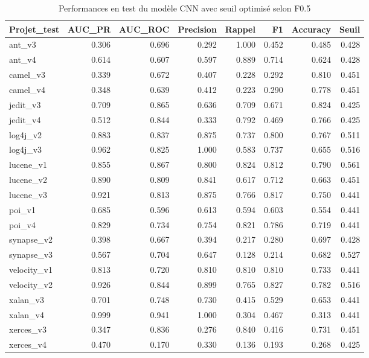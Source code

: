 \begin{table}
\caption{Performances en test du modèle CNN avec seuil optimisé selon F0.5}
\label{tab:cnn_f05}
\begin{tabular}{lrrrrrrr}
\toprule
Projet_test & AUC_PR & AUC_ROC & Precision & Rappel & F1 & Accuracy & Seuil \\
\midrule
ant_v3 & 0.306 & 0.696 & 0.292 & 1.000 & 0.452 & 0.485 & 0.428 \\
ant_v4 & 0.614 & 0.607 & 0.597 & 0.889 & 0.714 & 0.624 & 0.428 \\
camel_v3 & 0.339 & 0.672 & 0.407 & 0.228 & 0.292 & 0.810 & 0.451 \\
camel_v4 & 0.348 & 0.639 & 0.412 & 0.223 & 0.290 & 0.778 & 0.451 \\
jedit_v3 & 0.709 & 0.865 & 0.636 & 0.709 & 0.671 & 0.824 & 0.425 \\
jedit_v4 & 0.512 & 0.844 & 0.333 & 0.792 & 0.469 & 0.766 & 0.425 \\
log4j_v2 & 0.883 & 0.837 & 0.875 & 0.737 & 0.800 & 0.767 & 0.511 \\
log4j_v3 & 0.962 & 0.825 & 1.000 & 0.583 & 0.737 & 0.655 & 0.516 \\
lucene_v1 & 0.855 & 0.867 & 0.800 & 0.824 & 0.812 & 0.790 & 0.561 \\
lucene_v2 & 0.890 & 0.809 & 0.841 & 0.617 & 0.712 & 0.663 & 0.451 \\
lucene_v3 & 0.921 & 0.813 & 0.875 & 0.766 & 0.817 & 0.750 & 0.441 \\
poi_v1 & 0.685 & 0.596 & 0.613 & 0.594 & 0.603 & 0.554 & 0.441 \\
poi_v4 & 0.829 & 0.734 & 0.754 & 0.821 & 0.786 & 0.719 & 0.441 \\
synapse_v2 & 0.398 & 0.667 & 0.394 & 0.217 & 0.280 & 0.697 & 0.428 \\
synapse_v3 & 0.567 & 0.704 & 0.647 & 0.128 & 0.214 & 0.682 & 0.527 \\
velocity_v1 & 0.813 & 0.720 & 0.810 & 0.810 & 0.810 & 0.733 & 0.441 \\
velocity_v2 & 0.926 & 0.844 & 0.899 & 0.765 & 0.827 & 0.782 & 0.516 \\
xalan_v3 & 0.701 & 0.748 & 0.730 & 0.415 & 0.529 & 0.653 & 0.441 \\
xalan_v4 & 0.999 & 0.941 & 1.000 & 0.304 & 0.467 & 0.313 & 0.441 \\
xerces_v3 & 0.347 & 0.836 & 0.276 & 0.840 & 0.416 & 0.731 & 0.451 \\
xerces_v4 & 0.470 & 0.170 & 0.330 & 0.136 & 0.193 & 0.268 & 0.425 \\
\bottomrule
\end{tabular}
\end{table}
